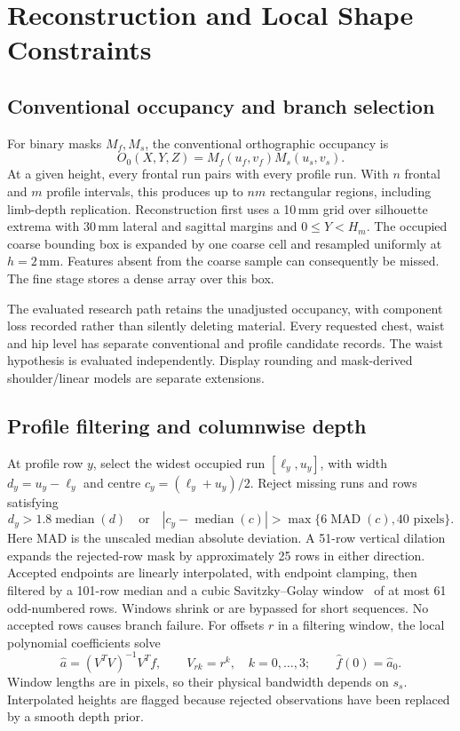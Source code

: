 \documentclass[11pt,a4paper]{article}
\begin{document}
\section{Reconstruction and Local Shape Constraints}
\subsection{Conventional occupancy and branch selection}
For binary masks $M_f,M_s$, the conventional orthographic occupancy is
\begin{equation}
 O_0(X,Y,Z)=M_f(u_f,v_f)M_s(u_s,v_s).
 \label{eq:hull}
\end{equation}
At a given height, every frontal run pairs with every profile run. With $n$ frontal and $m$ profile intervals, this produces up to $nm$ rectangular regions, including limb-depth replication. Reconstruction first uses a 10\,mm grid over silhouette extrema with 30\,mm lateral and sagittal margins and $0\leq Y<H_m$. The occupied coarse bounding box is expanded by one coarse cell and resampled uniformly at $h=2$\,mm. Features absent from the coarse sample can consequently be missed. The fine stage stores a dense array over this box.

The evaluated research path retains the unadjusted occupancy, with component loss recorded rather than silently deleting material. Every requested chest, waist and hip level has separate conventional and profile candidate records. The waist hypothesis is evaluated independently. Display rounding and mask-derived shoulder/linear models are separate extensions.

\subsection{Profile filtering and columnwise depth}
At profile row $y$, select the widest occupied run $[\ell_y,u_y]$, with width $d_y=u_y-\ell_y$ and centre $c_y=(\ell_y+u_y)/2$. Reject missing runs and rows satisfying
\begin{equation}
 d_y>1.8\operatorname{median}(d)\quad\text{or}\quad
 |c_y-\operatorname{median}(c)|>
 \max\{6\operatorname{MAD}(c),40\text{ pixels}\}.
\end{equation}
Here MAD is the unscaled median absolute deviation. A 51-row vertical dilation expands the rejected-row mask by approximately 25 rows in either direction. Accepted endpoints are linearly interpolated, with endpoint clamping, then filtered by a 101-row median and a cubic Savitzky--Golay window~\cite{savitzky1964smoothing} of at most 61 odd-numbered rows. Windows shrink or are bypassed for short sequences. No accepted rows causes branch failure. For offsets $r$ in a filtering window, the local polynomial coefficients solve
\begin{equation}
 \hat a=(V^TV)^{-1}V^Tf,\qquad V_{rk}=r^k,\quad k=0,\ldots,3;
 \qquad \hat f(0)=\hat a_0.
\end{equation}
Window lengths are in pixels, so their physical bandwidth depends on $s_s$. Interpolated heights are flagged because rejected observations have been replaced by a smooth depth prior.
\end{document}
